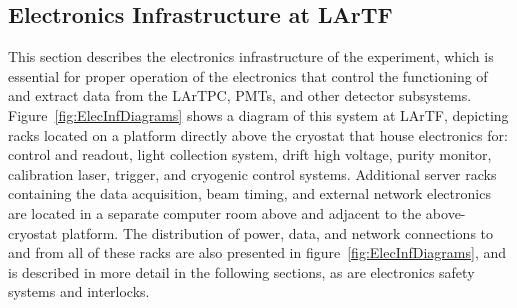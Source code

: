 \subsection{Electronics Infrastructure at LArTF}
\label{sec:lartf}


This section describes the electronics infrastructure of the experiment, which is essential for proper operation of the electronics that control the functioning of and extract data from the LArTPC, PMTs, and other detector subsystems.  Figure~\ref{fig:ElecInfDiagrams} shows a diagram of this system at LArTF, depicting racks located on a platform directly above the cryostat that house electronics for: \lartpc control and readout, light collection system, drift high voltage, purity monitor, calibration laser, trigger, and cryogenic control systems.  Additional server racks containing the data acquisition, beam timing, and external network electronics are located in a separate computer room above and adjacent to the above-cryostat platform.  The distribution of power, data, and network connections to and from all of these racks are also presented in figure~\ref{fig:ElecInfDiagrams}, and is described in more detail in the following sections, as are electronics safety systems and interlocks.

